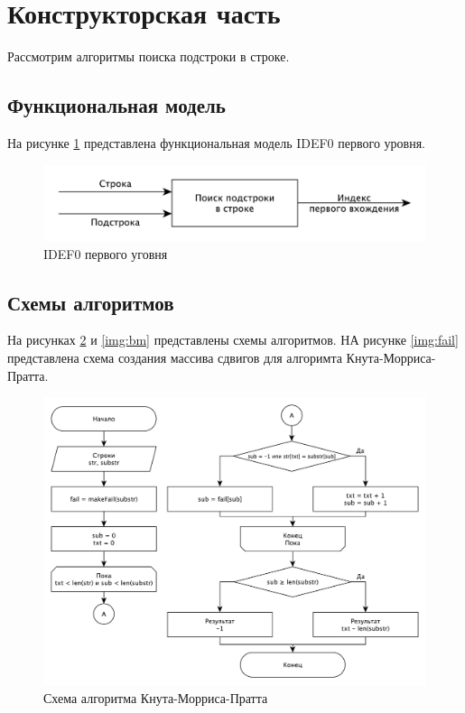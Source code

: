 \documentclass[a4paper,12pt]{article}
\begin{document}
\newpage
\section{Конструкторская часть}

Рассмотрим алгоритмы поиска подстроки в строке.

\subsection{Функциональная модель}

На рисунке \ref{img:idef0} представлена функциональная модель IDEF0
первого уровня.

\begin{figure}[H]
    \centering
    \includegraphics[scale=0.9]{idef0}
    \caption{IDEF0 первого уговня}
    \label{img:idef0}
\end{figure}

\subsection{Схемы алгоритмов}

На рисунках \ref{img:kmp} и \ref{img:bm} представлены схемы алгоритмов.
НА рисунке \ref{img:fail} представлена схема создания массива сдвигов
для алгоримта Кнута-Морриса-Пратта.

\begin{figure}[H]
    \centering
    \includegraphics[scale=0.65]{knuth_morris_pratt}
    \caption{Схема алгоритма Кнута-Морриса-Пратта}
    \label{img:kmp}
\end{figure}
\end{document}
